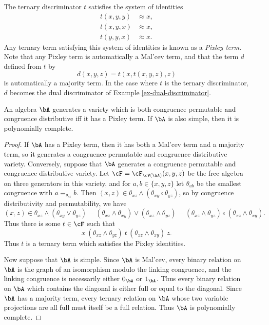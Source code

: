 The ternary discriminator $t$ satisfies the system of identities
\begin{align*}
t(x,y,y) &\approx x,\\
t(x,y,x) &\approx x,\\
t(y,y,x) &\approx x.
\end{align*}
Any ternary term satisfying this system of identities is known as a \emph{Pixley term}. Note that any Pixley term is automatically a Mal'cev term, and that the term $d$ defined from $t$ by
\[
d(x,y,z) = t(x,t(x,y,z),z)
\]
is automatically a majority term. In the case where $t$ is the ternary discriminator, $d$ becomes the dual discriminator of Example \ref{ex-dual-discriminator}.

\begin{thm}\label{pixley-poly} An algebra $\bA$ generates a variety which is both congruence permutable and congruence distributive iff it has a Pixley term. If $\bA$ is also simple, then it is polynomially complete.
\end{thm}
\begin{proof} If $\bA$ has a Pixley term, then it has both a Mal'cev term and a majority term, so it generates a congruence permutable and congruence distributive variety. Conversely, suppose that $\bA$ generates a congruence permutable and congruence distributive variety. Let $\cF = \cF_{\cV(\bA)}(x,y,z)$ be the free algebra on three generators in this variety, and for $a,b \in \{x,y,z\}$ let $\theta_{ab}$ be the smallest congruence with $a \equiv_{\theta_{ab}} b$. Then $(x,z) \in \theta_{xz} \wedge (\theta_{xy} \circ \theta_{yz})$, so by congruence distributivity and permutability, we have
\[
(x,z) \in \theta_{xz} \wedge (\theta_{xy} \vee \theta_{yz}) = (\theta_{xz} \wedge \theta_{xy}) \vee (\theta_{xz} \wedge \theta_{yz}) = (\theta_{xz} \wedge \theta_{yz}) \circ (\theta_{xz} \wedge \theta_{xy}).
\]
Thus there is some $t \in \cF$ such that
\[
x\ (\theta_{xz} \wedge \theta_{yz})\ t\ (\theta_{xz} \wedge \theta_{xy})\ z.
\]
Thus $t$ is a ternary term which satisfies the Pixley identities.

Now suppose that $\bA$ is simple. Since $\bA$ is Mal'cev, every binary relation on $\bA$ is the graph of an isomorphism modulo the linking congruence, and the linking congruence is necessarily either $0_\bA$ or $1_\bA$. Thus every binary relation on $\bA$ which contains the diagonal is either full or equal to the diagonal. Since $\bA$ has a majority term, every ternary relation on $\bA$ whose two variable projections are all full must itself be a full relation. Thus $\bA$ is polynomially complete.
\end{proof}

